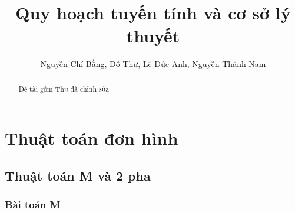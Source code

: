 \documentclass{article}
\title{Quy hoạch tuyến tính và cơ sở lý thuyết}
\author{Nguyễn Chí Bằng, Đỗ Thư, Lê Đức Anh, Nguyễn Thành Nam}
\begin{document}
\maketitle

\begin{abstract}
    Đề tài gồm
    Thư đã chỉnh sửa
\end{abstract}

\tableofcontents

\section{Thuật toán đơn hình}
    \subsection{Thuật toán M và 2 pha}
            \subsubsection{Bài toán M}
\end{document}
